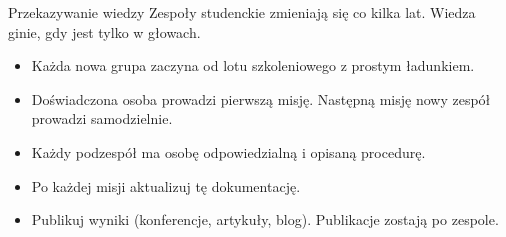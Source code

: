 \begin{sekcja}{Przekazywanie wiedzy}
Zespoły studenckie zmieniają się co kilka lat. Wiedza ginie, gdy jest tylko w głowach.
\begin{itemize}
  \item Każda nowa grupa zaczyna od lotu szkoleniowego z prostym ładunkiem.
  \item Doświadczona osoba prowadzi pierwszą misję. Następną misję nowy zespół prowadzi samodzielnie.
  \item Każdy podzespół ma osobę odpowiedzialną i opisaną procedurę.
  \item Po każdej misji aktualizuj tę dokumentację.
  \item Publikuj wyniki (konferencje, artykuły, blog). Publikacje zostają po zespole.
\end{itemize}
\end{sekcja}

